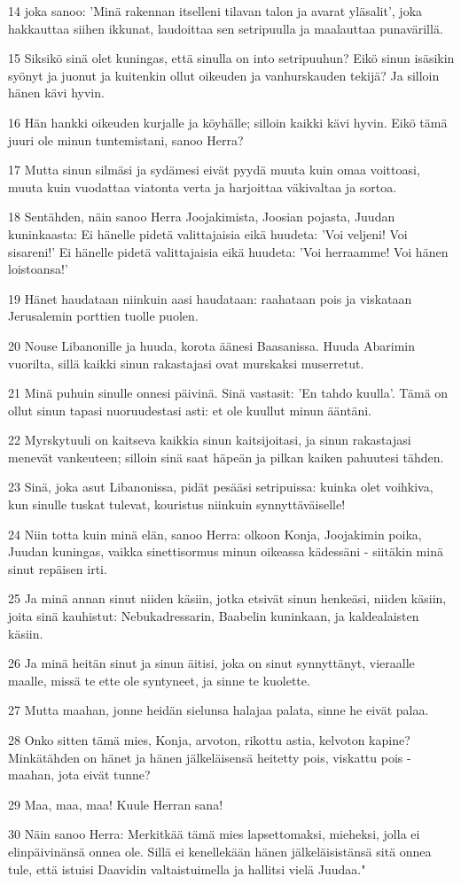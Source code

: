 \par 14 joka sanoo: 'Minä rakennan itselleni tilavan talon ja avarat yläsalit', joka hakkauttaa siihen ikkunat, laudoittaa sen setripuulla ja maalauttaa punavärillä.
\par 15 Siksikö sinä olet kuningas, että sinulla on into setripuuhun? Eikö sinun isäsikin syönyt ja juonut ja kuitenkin ollut oikeuden ja vanhurskauden tekijä? Ja silloin hänen kävi hyvin.
\par 16 Hän hankki oikeuden kurjalle ja köyhälle; silloin kaikki kävi hyvin. Eikö tämä juuri ole minun tuntemistani, sanoo Herra?
\par 17 Mutta sinun silmäsi ja sydämesi eivät pyydä muuta kuin omaa voittoasi, muuta kuin vuodattaa viatonta verta ja harjoittaa väkivaltaa ja sortoa.
\par 18 Sentähden, näin sanoo Herra Joojakimista, Joosian pojasta, Juudan kuninkaasta: Ei hänelle pidetä valittajaisia eikä huudeta: 'Voi veljeni! Voi sisareni!' Ei hänelle pidetä valittajaisia eikä huudeta: 'Voi herraamme! Voi hänen loistoansa!'
\par 19 Hänet haudataan niinkuin aasi haudataan: raahataan pois ja viskataan Jerusalemin porttien tuolle puolen.
\par 20 Nouse Libanonille ja huuda, korota äänesi Baasanissa. Huuda Abarimin vuorilta, sillä kaikki sinun rakastajasi ovat murskaksi muserretut.
\par 21 Minä puhuin sinulle onnesi päivinä. Sinä vastasit: 'En tahdo kuulla'. Tämä on ollut sinun tapasi nuoruudestasi asti: et ole kuullut minun ääntäni.
\par 22 Myrskytuuli on kaitseva kaikkia sinun kaitsijoitasi, ja sinun rakastajasi menevät vankeuteen; silloin sinä saat häpeän ja pilkan kaiken pahuutesi tähden.
\par 23 Sinä, joka asut Libanonissa, pidät pesääsi setripuissa: kuinka olet voihkiva, kun sinulle tuskat tulevat, kouristus niinkuin synnyttäväiselle!
\par 24 Niin totta kuin minä elän, sanoo Herra: olkoon Konja, Joojakimin poika, Juudan kuningas, vaikka sinettisormus minun oikeassa kädessäni - siitäkin minä sinut repäisen irti.
\par 25 Ja minä annan sinut niiden käsiin, jotka etsivät sinun henkeäsi, niiden käsiin, joita sinä kauhistut: Nebukadressarin, Baabelin kuninkaan, ja kaldealaisten käsiin.
\par 26 Ja minä heitän sinut ja sinun äitisi, joka on sinut synnyttänyt, vieraalle maalle, missä te ette ole syntyneet, ja sinne te kuolette.
\par 27 Mutta maahan, jonne heidän sielunsa halajaa palata, sinne he eivät palaa.
\par 28 Onko sitten tämä mies, Konja, arvoton, rikottu astia, kelvoton kapine? Minkätähden on hänet ja hänen jälkeläisensä heitetty pois, viskattu pois - maahan, jota eivät tunne?
\par 29 Maa, maa, maa! Kuule Herran sana!
\par 30 Näin sanoo Herra: Merkitkää tämä mies lapsettomaksi, mieheksi, jolla ei elinpäivinänsä onnea ole. Sillä ei kenellekään hänen jälkeläisistänsä sitä onnea tule, että istuisi Daavidin valtaistuimella ja hallitsi vielä Juudaa."

